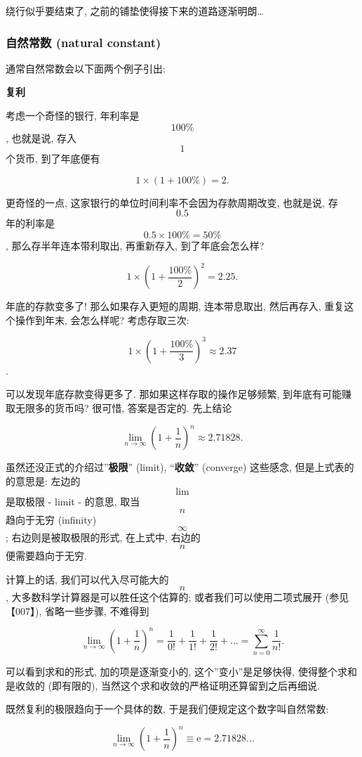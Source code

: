 绕行似乎要结束了, 之前的铺垫使得接下来的道路逐渐明朗\ldots{}

\hypertarget{ux81eaux7136ux5e38ux6570-natural-constant}{%
\subsubsection{自然常数 (natural
constant)}\label{ux81eaux7136ux5e38ux6570-natural-constant}}

通常自然常数会以下面两个例子引出:

\textbf{复利}

考虑一个奇怪的银行, 年利率是 \[100\%\], 也就是说, 存入 \[1\] 个货币,
到了年底便有

\[1\times(1+100\%)=2.\]

更奇怪的一点, 这家银行的单位时间利率不会因为存款周期改变, 也就是说, 存
\[0.5\] 年的利率是 \[0.5\times100\%=50\%\], 那么存半年连本带利取出,
再重新存入, 到了年底会怎么样?

\[1\times\left(1+\frac{100\%}{2}\right)^2=2.25.\]

年底的存款变多了! 那么如果存入更短的周期, 连本带息取出, 然后再存入,
重复这个操作到年末, 会怎么样呢? 考虑存取三次:

\[1\times\left(1+\frac{100\%}{3}\right)^3\approx2.37\].

可以发现年底存款变得更多了. 那如果这样存取的操作足够频繁,
到年底有可能赚取无限多的货币吗? 很可惜, 答案是否定的. 先上结论

\[\lim_{n\rightarrow\infty}\left(1+\frac{1}{n}\right)^n\approx2.71828.\]

虽然还没正式的介绍过''\textbf{极限}'' (limit), ``\textbf{收敛}''
(converge) 这些感念, 但是上式表的的意思是: 左边的 \[\lim\] 是取极限 -
limit - 的意思, 取当 \[n\] 趋向于无穷 (infinity) \[\infty\];
右边则是被取极限的形式, 在上式中, 右边的 \[n\] 便需要趋向于无穷.

计算上的话, 我们可以代入尽可能大的 \[n\],
大多数科学计算器是可以胜任这个估算的; 或者我们可以使用二项式展开
(参见【007】), 省略一些步骤, 不难得到

\[\lim_{n\rightarrow\infty}\left(1+\frac{1}{n}\right)^n=\frac{1}{0!}+\frac{1}{1!}+\frac{1}{2!}+...=\sum_{n=0}^\infty\frac{1}{n!}.\]

可以看到求和的形式, 加的项是逐渐变小的, 这个''变小''是足够快得,
使得整个求和是收敛的 (即有限的),
当然这个求和收敛的严格证明还算留到之后再细说.

既然复利的极限趋向于一个具体的数, 于是我们便规定这个数字叫自然常数:

\[\boxed{\lim_{n\rightarrow\infty}\left(1+\frac{1}{n}\right)^n\equiv\mathrm{e}=2.71828...}\]

